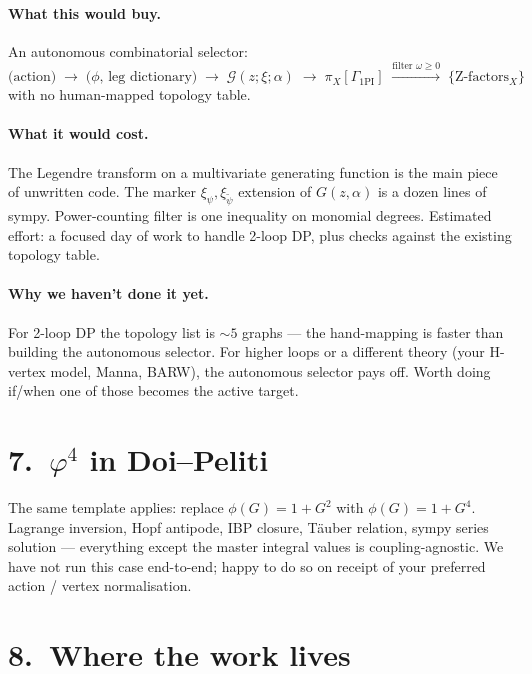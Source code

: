 \documentclass[11pt,a4paper]{article}
\begin{document}
\paragraph{What this would buy.} An autonomous combinatorial selector:
\[
\big(\text{action}\big) \;\to\; \big(\phi,\,\text{leg dictionary}\big) \;\to\; \mathcal{G}(z;\xi;\alpha)
\;\to\; \pi_X[\Gamma_{\text{1PI}}]\;\xrightarrow{\text{filter }\omega\ge 0}\; \{\text{Z-factors}_X\}
\]
with no human-mapped topology table.

\paragraph{What it would cost.} The Legendre transform on a multivariate generating function is the main piece of unwritten code. The marker $\xi_\psi, \xi_{\tilde\psi}$ extension of $G(z,\alpha)$ is a dozen lines of sympy. Power-counting filter is one inequality on monomial degrees. Estimated effort: a focused day of work to handle 2-loop DP, plus checks against the existing topology table.

\paragraph{Why we haven't done it yet.} For 2-loop DP the topology list is $\sim 5$ graphs --- the hand-mapping is faster than building the autonomous selector. For higher loops or a different theory (your H-vertex model, Manna, BARW), the autonomous selector pays off. Worth doing if/when one of those becomes the active target.

\section*{7.\ $\varphi^4$ in Doi--Peliti}

The same template applies: replace $\phi(G) = 1+G^2$ with $\phi(G) = 1+G^4$. Lagrange inversion, Hopf antipode, IBP closure, T\"auber relation, sympy series solution --- everything except the master integral values is coupling-agnostic. We have not run this case end-to-end; happy to do so on receipt of your preferred action / vertex normalisation.

\section*{8.\ Where the work lives}
\end{document}

